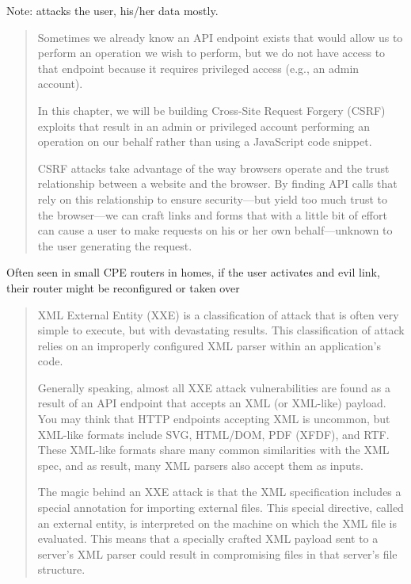 \documentclass[Screen16to9,17pt]{foils}
\begin{document}
Note: attacks the user, his/her data mostly.


\begin{quote}
Sometimes we already know an API endpoint exists that would allow us to perform an operation we wish to perform, but we do not have access to that endpoint because it requires privileged access (e.g., an admin account).

In this chapter, we will be building Cross-Site Request Forgery (CSRF) exploits that result in an admin or privileged account performing an operation on our behalf rather than using a JavaScript code snippet.

CSRF attacks take advantage of the way browsers operate and the trust relationship between a website and the browser. By finding API calls that rely on this relationship to ensure security—but yield too much trust to the browser—we can craft links and forms that with a little bit of effort can cause a user to make requests on his or her own behalf—unknown to the user generating the request.
\end{quote}

\begin{list2}
  \item Often seen in small CPE routers in homes, if the user activates and evil link, their router might be reconfigured or taken over
\end{list2}


\begin{quote}
XML External Entity (XXE) is a classification of attack that is often very simple to execute, but with devastating results. This classification of attack relies on an improperly configured XML parser within an application’s code.

Generally speaking, almost all XXE attack vulnerabilities are found as a result of an API endpoint that accepts an XML (or XML-like) payload. You may think that HTTP endpoints accepting XML is uncommon, but XML-like formats include SVG, HTML/DOM, PDF (XFDF), and RTF. These XML-like formats share many common similarities with the XML spec, and as result, many XML parsers also accept them as inputs.

The magic behind an XXE attack is that the XML specification includes a special annotation for importing external files. This special directive, called an external entity, is interpreted on the machine on which the XML file is evaluated. This means that a specially crafted XML payload sent to a server’s XML parser could result in compromising files in that server’s file structure.
\end{quote}
\end{document}
